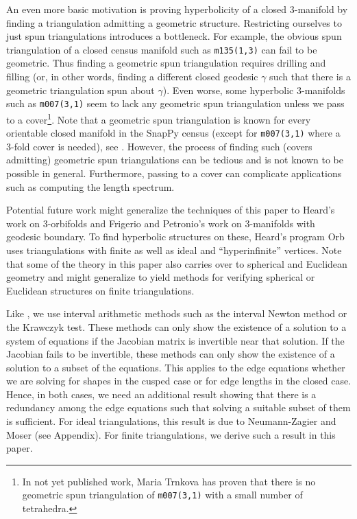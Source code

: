 \documentclass[utopia,fullpage]{nmd/article}
\begin{document}
An even more basic motivation is proving hyperbolicity of a closed 3-manifold by finding a triangulation admitting a geometric structure. Restricting ourselves to just spun triangulations introduces a bottleneck. For example, the obvious spun triangulation of a closed census manifold such as \texttt{m135(1,3)} can fail to be geometric. Thus finding a geometric spun triangulation requires drilling and filling (or, in other words, finding a different closed geodesic $\gamma$ such that there is a geometric triangulation spun about $\gamma$). Even worse, some hyperbolic 3-manifolds such as \texttt{m007(3,1)} seem to lack any geometric spun triangulation unless we pass to a cover\footnote{In not yet published work, Maria Trnkova has proven that there is no geometric spun triangulation of \texttt{m007(3,1)} with a small number of tetrahedra.}. Note that a geometric spun triangulation is known for every orientable closed manifold in the SnapPy census (except for \texttt{m007(3,1)} where a 3-fold cover is needed), see \cite{hikmot}. However, the process of finding such (covers admitting)  geometric spun triangulations can be tedious and is not known to be possible in general. Furthermore, passing to a cover can complicate applications such as computing the length spectrum.

Potential future work might generalize the techniques of this paper to Heard's work \cite{heardThesis} on 3-orbifolds and Frigerio and Petronio's work \cite{frigPet} on 3-manifolds with geodesic boundary. To find hyperbolic structures on these, Heard's program Orb \cite{orb} uses triangulations with finite as well as ideal and ``hyperinfinite'' vertices. Note that some of the theory in this paper also carries over to spherical and Euclidean geometry and might generalize to yield methods for verifying spherical or Euclidean structures on finite triangulations.

Like \cite{hikmot}, we use interval arithmetic methods such as the interval Newton method or the Krawczyk test. These methods can only show the existence of a solution to a system of equations if the Jacobian matrix is invertible near that solution. If the Jacobian fails to be invertible, these methods can only show the existence of a solution to a subset of the equations. This applies to the edge equations whether we are solving for shapes in the cusped case or for edge lengths in the closed case. Hence, in both cases, we need an additional result showing that there is a redundancy among the edge equations such that solving a suitable subset of them is sufficient. For ideal triangulations, this result is due to Neumann-Zagier \cite{NeumannZagier,NeumannComb} and Moser \cite{moser} (see Appendix). For finite triangulations, we derive such a result in this paper.
\end{document}
